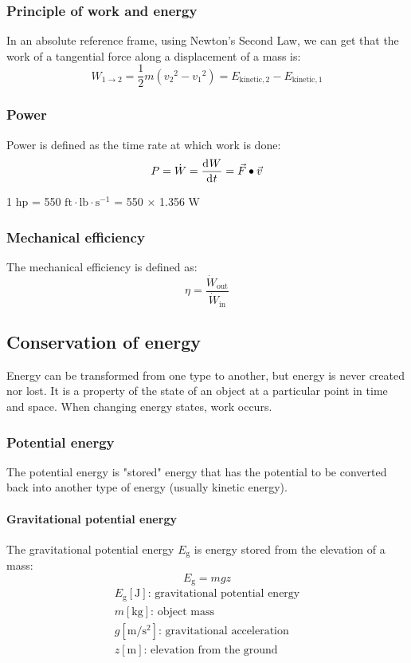 \documentclass[10pt, twocolumn]{article}
\begin{document}
\subsubsection{Principle of work and energy}
In an absolute reference frame, using Newton's Second Law, we can get that the work of a tangential force along a displacement of a mass is:
\[
  W_{1 \to 2} = \frac{1}{2}m \left( {v_2}^2 - {v_1}^2 \right) = E_\mathrm{kinetic,2} - E_\mathrm{kinetic,1}
\]

\subsubsection{Power}
Power is defined as the time rate at which work is done:
\[
  P = \dot{W} = \frac{\mathrm{d}^{} W}{\mathrm{d}^{} t} = \vec{F} \bullet \vec{v}
\]

\begin{remark}
  1 hp = 550 \(\mathrm{ft} \cdot \mathrm{lb} \cdot \mathrm{s}^{-1}\) = 550 \(\times\) 1.356 \(\si{\watt}\)
\end{remark}


\subsubsection{Mechanical efficiency}
The mechanical efficiency is defined as:
\[
  \eta = \frac{\dot{W}_\mathrm{out}}{\dot{W}_\mathrm{in}}
\]


\subsection{Conservation of energy}
Energy can be transformed from one type to another, but energy is never created nor lost.
It is a property of the state of an object at a particular point in time and space.
When changing energy states, work occurs.


\subsubsection{Potential energy}
The potential energy is "stored" energy that has the potential to be converted back into another type of energy (usually kinetic energy).

\paragraph{Gravitational potential energy}
The gravitational potential energy \(E_\mathrm{g}\) is energy stored from the elevation of a mass:
\[
  E_\mathrm{g} = mgz
\]
\[
  \begin{array}{|l}
    E_\mathrm{g} [\si{\joule}] \text{: gravitational potential energy}     \\
    m [\si{\kilogram}] \text{: object mass}                                \\
    g [\si{\meter\per\second\squared}] \text{: gravitational acceleration} \\
    z [\si{\metre}] \text{: elevation from the ground}                     \\
  \end{array}
\]
\end{document}
